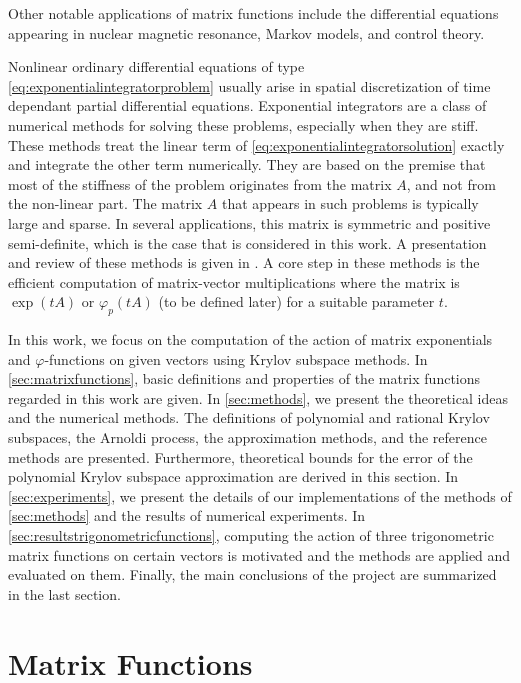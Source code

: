 Other notable applications of matrix functions include the differential equations
appearing in nuclear magnetic resonance, Markov models, and control theory.

Nonlinear ordinary differential equations of type \eqref{eq:exponentialintegratorproblem}
usually arise in spatial discretization of time dependant partial differential equations.
Exponential integrators are a class of numerical methods for solving these problems, especially
when they are stiff. These methods treat the linear term of \eqref{eq:exponentialintegratorsolution}
exactly and integrate the other term numerically. They are based on the premise that most of the
stiffness of the problem originates from the matrix $A$, and not from the non-linear part. The matrix
$A$ that appears in such problems is typically large and sparse. In several applications, this matrix
is symmetric and positive semi-definite, which is the case that is considered in this work.
A presentation and review of these methods is given in \cite{minchev2005review}.
A core step in these methods is the efficient computation of matrix-vector multiplications where
the matrix is $\exp(tA)$ or $\varphi_p(tA)$ (to be defined later) for a suitable parameter $t$.

In this work, we focus on the computation of the action of matrix exponentials and
$\varphi$-functions on given vectors using Krylov subspace methods.
In \autoref{sec:matrixfunctions}, basic definitions and properties of the matrix functions
regarded in this work are given. In \autoref{sec:methods}, we present the theoretical ideas
and the numerical methods. The definitions of polynomial and rational Krylov subspaces,
the Arnoldi process, the approximation methods, and the reference methods are presented.
Furthermore, theoretical bounds for the error of the polynomial Krylov subspace approximation
are derived in this section. In \autoref{sec:experiments}, we present the details of our
implementations of the methods of \autoref{sec:methods} and the results of numerical experiments.
In \autoref{sec:resultstrigonometricfunctions}, computing the action of three trigonometric
matrix functions on certain vectors is motivated and the methods are applied and evaluated on them.
Finally, the main conclusions of the project are summarized in the last section.

\section{Matrix Functions}
\label{sec:matrixfunctions}

